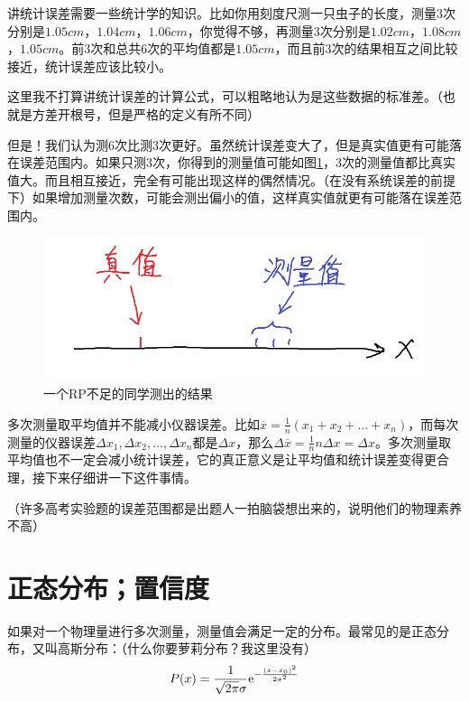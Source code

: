 讲统计误差需要一些统计学的知识。比如你用刻度尺测一只虫子的长度，测量$3$次分别是$1.05 \unit{cm}$，$1.04 \unit{cm}$，$1.06 \unit{cm}$，你觉得不够，再测量$3$次分别是$1.02 \unit{cm}$，$1.08 \unit{cm}$，$1.05 \unit{cm}$。前$3$次和总共$6$次的平均值都是$1.05 \unit{cm}$，而且前$3$次的结果相互之间比较接近，统计误差应该比较小。

这里我不打算讲统计误差的计算公式，可以粗略地认为是这些数据的标准差。（也就是方差开根号，但是严格的定义有所不同）

但是！我们认为测$6$次比测$3$次更好。虽然统计误差变大了，但是真实值更有可能落在误差范围内。如果只测$3$次，你得到的测量值可能如图\ref{fig-error-range}，$3$次的测量值都比真实值大。而且相互接近，完全有可能出现这样的偶然情况。（在没有系统误差的前提下）如果增加测量次数，可能会测出偏小的值，这样真实值就更有可能落在误差范围内。
\begin{figure}[htb]
\centering
\includegraphics[scale=0.5]{fig/error-range.png}
\caption{一个RP不足的同学测出的结果}
\label{fig-error-range}
\end{figure}

多次测量取平均值并不能减小仪器误差。比如$\overline{x}=\frac{1}{n}(x_1+x_2+\dots+x_n)$，而每次测量的仪器误差$\Delta x_1,\Delta x_2,\dots,\Delta x_n$都是$\Delta x$，那么$\Delta \overline{x}=\frac{1}{n} n \Delta x=\Delta x$。多次测量取平均值也不一定会减小统计误差，它的真正意义是让平均值和统计误差变得更合理，接下来仔细讲一下这件事情。

（许多高考实验题的误差范围都是出题人一拍脑袋想出来的，说明他们的物理素养不高）
\section{正态分布；置信度}
如果对一个物理量进行多次测量，测量值会满足一定的分布。最常见的是正态分布，又叫高斯分布：（什么你要萝莉分布？我这里没有）
\begin{equation*}
P(x)=\frac{1}{\sqrt{2 \pi} \sigma} \mathrm{e}^{-\frac{(x-x_0)^2}{2 \sigma^2}}
\end{equation*}

